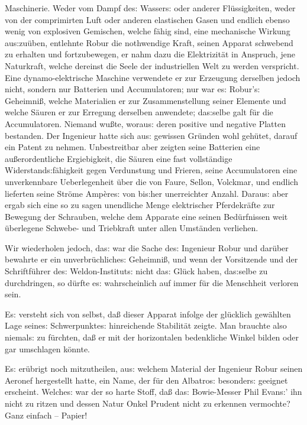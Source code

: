 \documentclass[oneside,12pt]{book}
\newcommand{\s}{s:}
\begin{document}
Maschinerie. Weder vom Dampf de{\s} Wasser{\s} oder anderer
Fl\"ussigkeiten, weder von der comprimirten Luft oder anderen
elastischen Gasen und endlich ebenso wenig von explosiven Gemischen,
welche f\"ahig sind, eine mechanische Wirkung au{\s}zu\"uben,
entlehnte Robur die nothwendige Kraft, seinen Apparat schwebend zu
erhalten und fort\/zubewegen, er nahm dazu die Elektrizit\"at in
Anspruch, jene Naturkraft, welche dereinst die Seele der
industriellen Welt zu werden verspricht. Eine dynamo-elektrische
Maschine verwendete er zur Erzeugung derselben jedoch nicht, sondern
nur Batterien und Accumulatoren; nur war e{\s} Robur'{\s}
Geheimni{\ss}, welche Materialien er zur Zusammenstellung seiner
Elemente und welche S\"auren er zur Erregung derselben anwendete;
da{\s}selbe galt f\"ur die Accumulatoren. Niemand wu{\ss}te,
worau{\s} deren positive und negative Platten bestanden. Der
Ingenieur hatte sich au{\s} gewissen Gr\"unden wohl geh\"utet, darauf
ein Patent zu nehmen. Unbestreitbar aber zeigten seine Batterien eine
au{\ss}erordentliche Ergiebigkeit, die S\"auren eine fast
vollst\"andige Widerstand{\s}f\"ahigkeit gegen Verdunstung und
Frieren, seine Accumulatoren eine unverkennbare Ueberlegenheit \"uber
die von Faure, Sellon, Volckmar, und endlich lieferten seine Str\"ome
Amp\`ere{\s} von bi{\s}her unerreichter Anzahl. Darau{\s} aber ergab
sich eine so zu sagen unendliche Menge elektrischer Pferdekr\"afte
zur Bewegung der Schrauben, welche dem Apparate eine seinen
Bed\"urfnissen weit \"uberlegene Schwebe- und Triebkraft unter allen
Umst\"anden verliehen.

Wir wiederholen jedoch, da{\s} war die Sache de{\s} Ingenieur Robur
und dar\"uber bewahrte er ein unverbr\"uchliche{\s} Geheimni{\ss},
und wenn der Vorsitzende und der Schriftf\"uhrer de{\s}
Weldon-Institut{\s} nicht da{\s} Gl\"uck haben, da{\s}selbe zu
durchdringen, so d\"urfte e{\s} wahrscheinlich auf immer f\"ur die
Menschheit verloren sein.

E{\s} versteht sich von selbst, da{\ss} dieser Apparat infolge der
gl\"ucklich gew\"ahlten Lage seine{\s} Schwerpunkte{\s} hinreichende
Stabilit\"at zeigte. Man brauchte also niemal{\s} zu f\"urchten,
da{\ss} er mit der horizontalen bedenkliche Winkel bilden oder gar
umschlagen k\"onnte.

E{\s} er\"ubrigt noch mit\/zutheilen, au{\s} welchem Material der
Ingenieur Robur seinen Aeronef hergestellt hatte, ein Name, der f\"ur
den {\glqq}Albatro{\s}{\grqq} besonder{\s} geeignet erscheint.
Welche{\s} war der so harte Stoff, da{\ss} da{\s} Bowie-Messer Phil
Evan{\s}' ihn nicht zu ritzen und dessen Natur Onkel Prudent nicht zu
erkennen vermochte? Ganz einfach -- Papier!
\end{document}
